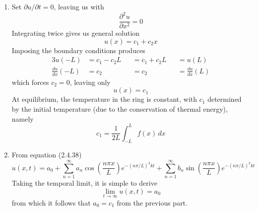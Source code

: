 \documentclass[a4paper]{article}
\begin{document}

\begin{enumerate}[label=(\alph*)]
	\item Set \( \partial u / \partial t = 0 \), leaving us with
	\[
		\frac{\partial^2 u}{\partial x^2} = 0 
	\]
	Integrating twice gives us general solution
	\[
		u \!\left( x \right) = c_{1} + c_{2}x 
	\]
	Imposing the boundary conditions produces
	\begin{alignat*}{3}
		u \!\left( -L \right) & = c_{1} - c_{2}L && = c_{1} + c_{2}L && = u \!\left( L \right) \\
		\frac{d u}{d x}\!\left( -L \right) & = c_{2} && = c_{2} && = \frac{d u}{d x}\!\left( L \right)
	\end{alignat*}
	which forces \( c_{2} = 0 \), leaving only
	\[
		u \!\left( x \right) = c_{1} 
	\]
	At equilibrium, the temperature in the ring is constant, with \( c_{1} \) determined by the initial temperature (due to the conservation of thermal energy), namely
	\[
		c_{1} = \frac{1}{2L}\int^{L}_{-L} f \!\left( x \right) \, dx  
	\]
	\item From equation (2.4.38)
	\[
		u \!\left( x,t \right) = a_{0} + \sum^{\infty}_{n=1} a_{n}\cos\!\left(\frac{n \pi x}{L}\right)e^{-\!\left( n \pi / L \right)^{2}kt} + \sum^{\infty}_{n=1} b_{n}\sin\!\left(\frac{n \pi x}{L}\right)e^{-\!\left( n \pi / L \right)^{2}kt} 
	\]
	Taking the temporal limit, it is simple to derive
	\[
		\lim\limits_{t \to \infty} u \!\left( x,t \right) = a_{0} 
	\]
	from which it follows that \( a_{0} = c_{1} \) from the previous part.
\end{enumerate}
\end{document}
